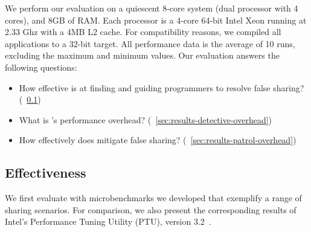 \label{sec:evaluation}

We perform our evaluation on a quiescent 8-core system (dual
processor with 4 cores), and 8GB of RAM. Each processor is a 4-core
64-bit Intel Xeon running at 2.33 Ghz with a 4MB L2 cache. For
compatibility reasons, we compiled all applications to a 32-bit
target. All performance data is the average of 10 runs, excluding the
maximum and minimum values. Our evaluation answers the following questions:

\begin{itemize}
\item How effective is \sheriffdetect{} at finding and guiding programmers to resolve false sharing? (\textsection~\ref{sec:detective:effectiveness})
\item What is \sheriffdetect{}'s performance overhead? (\textsection~\ref{sec:results-detective-overhead})
\item How effectively does \sheriffprotect{} mitigate false sharing? (\textsection~\ref{sec:results-patrol-overhead})
\end{itemize}

\subsection{\sheriffdetect{} Effectiveness}
\label{sec:detective:effectiveness}


We first evaluate \sheriffdetect{} with microbenchmarks we developed that exemplify a range of sharing scenarios. For comparison, we also present the
corresponding results of Intel's Performance Tuning Utility (PTU),
version 3.2~\cite{detect:ptu}.

